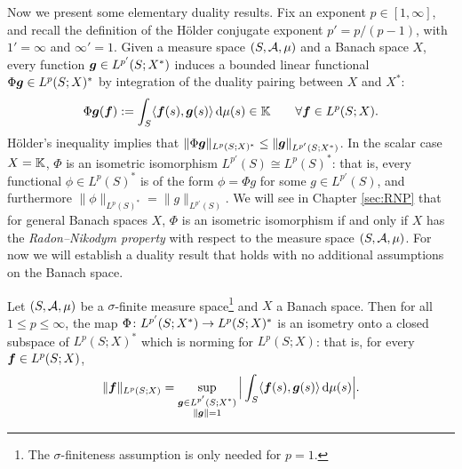 Now we present some elementary duality results.
Fix an exponent $p \in [1,\infty]$, and recall the definition of the H\"older conjugate exponent $p' = p/(p-1)$, with $1' = \infty$ and $\infty' = 1$.
Given a measure space $(S,\mathcal{A},\mu)$ and a Banach space $X$, every function $\bm{g} \in L^{p'}(S;X^*)$ induces a bounded linear functional $\Phi \bm{g} \in L^p(S;X)^*$ by integration of the duality pairing between $X$ and $X^*$:
\begin{equation*}
  \Phi \bm{g}(\bm{f}) := \int_S \langle \bm{f}(s), \bm{g}(s) \rangle \, \mathrm{d}\mu(s) \in \mathbb{K} \qquad \forall \bm{f} \in L^p(S;X).
\end{equation*}
H\"older's inequality implies that $\|\Phi \bm{g}\|_{L^p(S;X)^*} \leq \|\bm{g}\|_{L^{p'}(S;X^*)}$.
In the scalar case $X = \mathbb{K}$, $\Phi$ is an isometric isomorphism $L^{p'}(S) \cong L^p(S)^*$: that is, every functional $\phi \in L^p(S)^*$ is of the form $\phi = \Phi g$ for some $g \in L^{p'}(S)$, and furthermore $\|\phi\|_{L^p(S)^*} = \|g\|_{L^{p'}(S)}$.
We will see in Chapter \ref{sec:RNP} that for general Banach spaces $X$, $\Phi$ is an isometric isomorphism if and only if $X$ has the \emph{Radon--Nikodym property} with respect to the measure space $(S,\mathcal{A},\mu)$.
For now we will establish a duality result that holds with no additional assumptions on the Banach space.

\begin{prop}\label{prop:bochner-preduality}
  Let $(S,\mathcal{A},\mu)$ be a $\sigma$-finite measure space\footnote{The $\sigma$-finiteness assumption is only needed for $p = 1$.} and $X$ a Banach space.
  Then for all $1 \leq p \leq \infty$, the map $\Phi \colon L^{p'}(S;X^*) \rightarrow L^p(S;X)^*$ is an isometry onto a closed subspace of $L^p(S;X)^*$ which is norming for $L^p(S;X)$: that is, for every $\bm{f} \in L^p(S;X)$,
  \begin{equation*}
    \|\bm{f}\|_{L^p(S;X)} = \sup_{\substack{\bm{g} \in L^{p'}(S;X^*) \\ \|\bm{g}\| = 1}} \Big| \int_S \langle \bm{f}(s), \bm{g}(s) \rangle \, \mathrm{d}\mu(s) \Big|.
  \end{equation*}
\end{prop}

